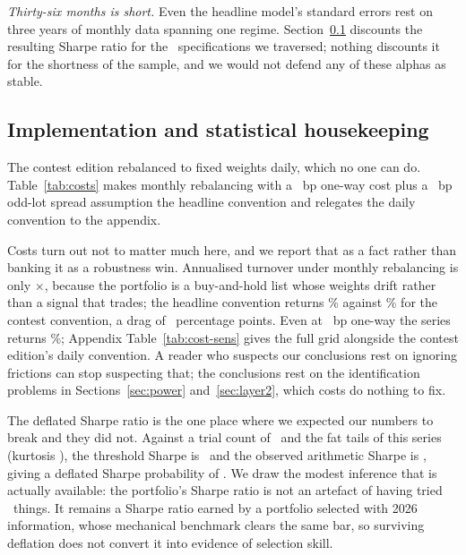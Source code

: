 \documentclass[a4paper,11pt]{article}
\begin{document}
\emph{Thirty-six months is short.} Even the headline model's standard errors rest on three years of
monthly data spanning one regime. Section~\ref{sec:costs} discounts the resulting Sharpe ratio for
the \SpecTotal\ specifications we traversed; nothing discounts it for the shortness of the sample,
and we would not defend any of these alphas as stable.



\subsection{Implementation and statistical housekeeping}\label{sec:costs}

The contest edition rebalanced to fixed weights daily, which no one can do. Table~\ref{tab:costs}
makes monthly rebalancing with a \CostOneWay\ bp one-way cost plus a \CostOddLot\ bp odd-lot spread
assumption the headline convention and relegates the daily convention to the appendix.

Costs turn out not to matter much here, and we report that as a fact rather than banking it as a
robustness win. Annualised turnover under monthly rebalancing is only \CostTurnover$\times$, because
the portfolio is a buy-and-hold list whose weights drift rather than a signal that trades; the
headline convention returns \CostHeadlineAnn\% against \CostContestAnn\% for the contest convention,
a drag of \CostDrag\ percentage points. Even at \CostGridMax\ bp one-way the series returns
\CostHundredBp\%; Appendix Table~\ref{tab:cost-sens} gives the full grid alongside the contest
edition's daily convention. A reader who suspects our conclusions rest on ignoring frictions can stop
suspecting that; the conclusions rest on the identification problems in
Sections~\ref{sec:power} and~\ref{sec:layer2}, which costs do nothing to fix.

The deflated Sharpe ratio is the one place where we expected our numbers to break and they did not.
Against a trial count of \SpecTotal\ and the fat tails of this series (kurtosis \DsrKurtosis), the
threshold Sharpe is \DsrThreshold\ and the observed arithmetic Sharpe is \DsrObserved, giving a
deflated Sharpe probability of \DsrProb. We draw the modest inference that is actually available:
the portfolio's Sharpe ratio is not an artefact of having tried \SpecTotal\ things. It remains a
Sharpe ratio earned by a portfolio selected with 2026 information, whose mechanical benchmark clears
the same bar, so surviving deflation does not convert it into evidence of selection skill.
\end{document}
